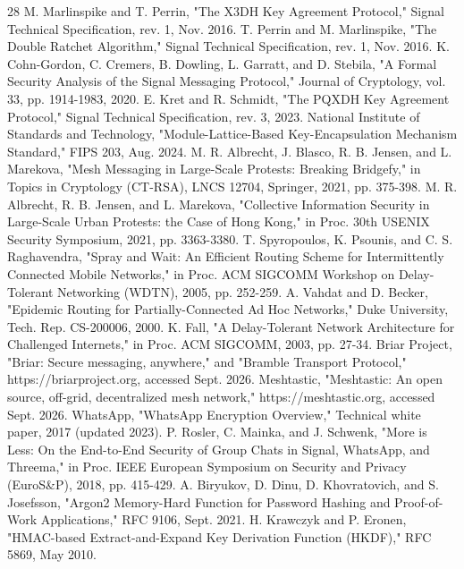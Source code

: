 \documentclass[conference]{IEEEtran}
\begin{document}
\begin{thebibliography}{28}
 M. Marlinspike and T. Perrin, "The X3DH Key Agreement Protocol," Signal Technical Specification, rev. 1, Nov. 2016.
 T. Perrin and M. Marlinspike, "The Double Ratchet Algorithm," Signal Technical Specification, rev. 1, Nov. 2016.
 K. Cohn-Gordon, C. Cremers, B. Dowling, L. Garratt, and D. Stebila, "A Formal Security Analysis of the Signal Messaging Protocol," Journal of Cryptology, vol. 33, pp. 1914-1983, 2020.
 E. Kret and R. Schmidt, "The PQXDH Key Agreement Protocol," Signal Technical Specification, rev. 3, 2023.
 National Institute of Standards and Technology, "Module-Lattice-Based Key-Encapsulation Mechanism Standard," FIPS 203, Aug. 2024.
 M. R. Albrecht, J. Blasco, R. B. Jensen, and L. Marekova, "Mesh Messaging in Large-Scale Protests: Breaking Bridgefy," in Topics in Cryptology (CT-RSA), LNCS 12704, Springer, 2021, pp. 375-398.
 M. R. Albrecht, R. B. Jensen, and L. Marekova, "Collective Information Security in Large-Scale Urban Protests: the Case of Hong Kong," in Proc. 30th USENIX Security Symposium, 2021, pp. 3363-3380.
 T. Spyropoulos, K. Psounis, and C. S. Raghavendra, "Spray and Wait: An Efficient Routing Scheme for Intermittently Connected Mobile Networks," in Proc. ACM SIGCOMM Workshop on Delay-Tolerant Networking (WDTN), 2005, pp. 252-259.
 A. Vahdat and D. Becker, "Epidemic Routing for Partially-Connected Ad Hoc Networks," Duke University, Tech. Rep. CS-200006, 2000.
 K. Fall, "A Delay-Tolerant Network Architecture for Challenged Internets," in Proc. ACM SIGCOMM, 2003, pp. 27-34.
 Briar Project, "Briar: Secure messaging, anywhere," and "Bramble Transport Protocol," https://briarproject.org, accessed Sept. 2026.
 Meshtastic, "Meshtastic: An open source, off-grid, decentralized mesh network," https://meshtastic.org, accessed Sept. 2026.
 WhatsApp, "WhatsApp Encryption Overview," Technical white paper, 2017 (updated 2023).
 P. Rosler, C. Mainka, and J. Schwenk, "More is Less: On the End-to-End Security of Group Chats in Signal, WhatsApp, and Threema," in Proc. IEEE European Symposium on Security and Privacy (EuroS\&P), 2018, pp. 415-429.
 A. Biryukov, D. Dinu, D. Khovratovich, and S. Josefsson, "Argon2 Memory-Hard Function for Password Hashing and Proof-of-Work Applications," RFC 9106, Sept. 2021.
 H. Krawczyk and P. Eronen, "HMAC-based Extract-and-Expand Key Derivation Function (HKDF)," RFC 5869, May 2010.

\end{thebibliography}
\end{document}
